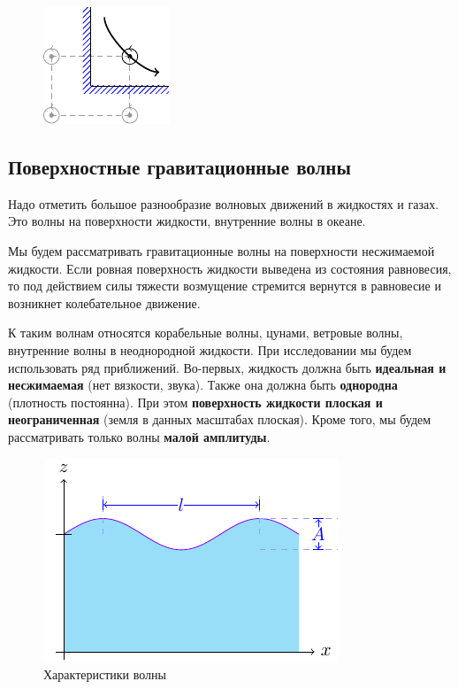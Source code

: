 \begin{figure}[H]
    \centering
    \includegraphics[scale=1.75]{img/5G}
    \caption{}
    \label{fig:figure1}
\end{figure}



\newpage
\subsection{Поверхностные гравитационные волны}

Надо отметить большое разнообразие волновых движений в
жидкостях и газах. Это волны на поверхности жидкости, внутренние
волны в океане. 

Мы будем рассматривать гравитационные волны на поверхности
несжимаемой жидкости. Если ровная поверхность жидкости выведена
из состояния равновесия, то под действием силы тяжести возмущение
стремится вернутся в равновесие и возникнет колебательное движение.


К таким волнам относятся корабельные волны, цунами, ветровые волны, внутренние волны в неоднородной жидкости. При исследовании мы будем использовать ряд приближений. Во-первых, жидкость должна быть \textbf{идеальная и несжимаемая} (нет вязкости, звука). Также она должна быть \textbf{однородна} (плотность постоянна). При этом \textbf{поверхность жидкости плоская и неограниченная} (земля в данных масштабах плоская). Кроме того, мы будем рассматривать только волны \textbf{малой амплитуды}.

\begin{figure}[H]
    \centering
    \includegraphics[scale=1.5]{img/simple_wave}
    \caption{Характеристики волны}
    \label{fig:simplewave}
\end{figure}

